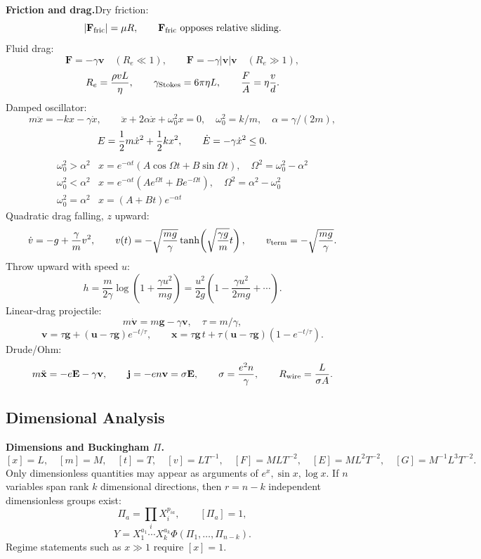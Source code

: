 \noindent\textbf{Friction and drag.}\quad Dry friction:
\[
  |\mathbf F_{\rm fric}|=\mu R,\qquad
  \mathbf F_{\rm fric}\ \text{opposes relative sliding}.
\]
Fluid drag:
\[
  \mathbf F=-\gamma\mathbf v\quad(R_e\ll1),\qquad
  \mathbf F=-\gamma|\mathbf v|\mathbf v\quad(R_e\gg1),
\]
\[
  R_e=\frac{\rho vL}{\eta},\qquad
  \gamma_{\rm Stokes}=6\pi\eta L,\qquad
  \frac{F}{A}=\eta\frac{v}{d}.
\]
Damped oscillator:
\[
  m\ddot x=-kx-\gamma\dot x,\qquad
  \ddot x+2\alpha\dot x+\omega_0^2x=0,\quad
  \omega_0^2=k/m,\quad \alpha=\gamma/(2m),
\]
\[
  E=\frac{1}{2} m\dot x^2+\frac{1}{2} kx^2,\qquad \dot E=-\gamma\dot x^2\le0.
\]
\[
\begin{array}{c|c}
\omega_0^2>\alpha^2 &
x=e^{-\alpha t}(A\cos\Omega t+B\sin\Omega t),\quad \Omega^2=\omega_0^2-\alpha^2\\
\omega_0^2<\alpha^2 &
x=e^{-\alpha t}(Ae^{\Omega t}+Be^{-\Omega t}),\quad \Omega^2=\alpha^2-\omega_0^2\\
\omega_0^2=\alpha^2 &
x=(A+Bt)e^{-\alpha t}
\end{array}
\]
Quadratic drag falling, $z$ upward:
\[
  \dot v=-g+\frac{\gamma}{m}v^2,\qquad
  v(t)=-\sqrt{\frac{mg}{\gamma}}\tanh\!\left(\sqrt{\frac{\gamma g}{m}}t\right),
  \qquad
  v_{\rm term}=-\sqrt{\frac{mg}{\gamma}}.
\]
Throw upward with speed $u$:
\[
  h=\frac{m}{2\gamma}\log\left(1+\frac{\gamma u^2}{mg}\right)
  =\frac{u^2}{2g}\left(1-\frac{\gamma u^2}{2mg}+\cdots\right).
\]
Linear-drag projectile:
\[
  m\dot{\mathbf v}=m\mathbf g-\gamma\mathbf v,\quad \tau=m/\gamma,
\]
\[
  \mathbf v=\tau\mathbf g+(\mathbf u-\tau\mathbf g)e^{-t/\tau},\qquad
  \mathbf x=\tau\mathbf g\,t+\tau(\mathbf u-\tau\mathbf g)(1-e^{-t/\tau}).
\]
Drude/Ohm:
\[
  m\ddot{\mathbf x}=-e\mathbf E-\gamma\mathbf v,\qquad
  \mathbf j=-en\mathbf v=\sigma\mathbf E,\qquad
  \sigma=\frac{e^2n}{\gamma},\qquad R_{\rm wire}=\frac{L}{\sigma A}.
\]

\subsection{Dimensional Analysis}

\noindent\textbf{Dimensions and Buckingham $\Pi$.}\quad
\[
  [x]=L,\quad [m]=M,\quad [t]=T,\quad
  [v]=LT^{-1},\quad [F]=MLT^{-2},\quad [E]=ML^2T^{-2},\quad
  [G]=M^{-1}L^3T^{-2}.
\]
Only dimensionless quantities may appear as arguments of $e^x,\sin x,\log x$.
If $n$ variables span rank $k$ dimensional directions, then $r=n-k$ independent
dimensionless groups exist:
\[
  \Pi_a=\prod_i X_i^{p_{ia}},\qquad [\Pi_a]=1,
\]
\[
  \boxed{Y=X_1^{a_1}\cdots X_k^{a_k}\Phi(\Pi_1,\ldots,\Pi_{n-k})}.
\]
Regime statements such as $x\gg1$ require $[x]=1$. 

